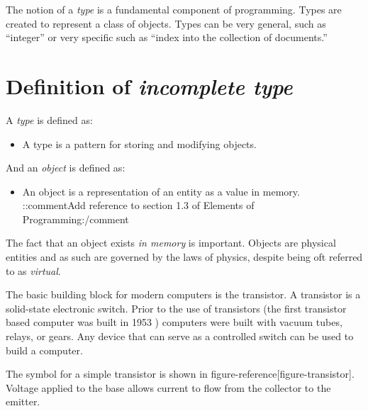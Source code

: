 The notion of a \textit{type} is a fundamental component of programming. Types are created to represent a class of objects. Types can be very general, such as “integer” or very specific such as “index into the collection of documents.”


\section{Definition of \textit{incomplete type}}

A \textit{type} is defined as:

\begin{itemize}
\item A type is a pattern for storing and modifying objects.
\end{itemize}

And an \textit{object} is defined as:

\begin{itemize}
\item An object is a representation of an entity as a value in memory. {::comment}Add reference to section 1.3 of Elements of Programming{:/comment}
\end{itemize}

The fact that an object exists \textit{in memory} is important. Objects are physical entities and as such are governed by the laws of physics, despite being oft referred to as \textit{virtual}.

The basic building block for modern computers is the transistor. A transistor is a solid-state electronic switch. Prior to the use of transistors (the first transistor based computer was built in 1953 ) computers were built with vacuum tubes, relays, or gears.  Any device that can serve as a controlled switch can be used to build a computer.


The symbol for a simple transistor is shown in {{figure-reference[figure-transistor]}}. Voltage applied to the base allows current to flow from the collector to the emitter.



